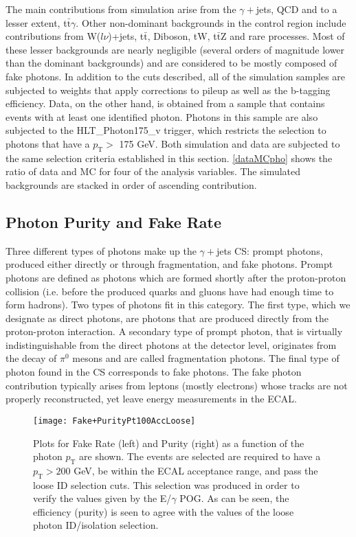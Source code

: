 The main contributions from simulation arise from the $\gamma+$jets, QCD and to a lesser extent, t$\bar{\text{t}}\gamma$. Other non-dominant backgrounds in the control region include contributions from W($l\nu$)+jets, t$\bar{\text{t}}$, Diboson, tW, t$\bar{\text{t}}$Z and rare processes. Most of these lesser backgrounds are nearly negligible (several orders of magnitude lower than the dominant backgrounds) and are considered to be mostly composed of fake photons. In addition to the cuts described, all of the simulation samples are subjected to weights that apply corrections to pileup as well as the b-tagging efficiency. Data, on the other hand, is obtained from a sample that contains events with at least one identified photon. Photons in this sample are also subjected to the HLT\_Photon175\_v trigger, which restricts the selection to photons that have a $p_\text{T} >$ 175 GeV. Both simulation and data are subjected to the same selection criteria established in this section. \autoref{dataMCpho} shows the ratio of data and MC for four of the analysis variables. The simulated backgrounds are stacked in order of ascending contribution.

\subsection{Photon Purity and Fake Rate}\label{purity&fakerate}

Three different types of photons make up the $\gamma+$jets CS: prompt photons, produced either directly or through fragmentation, and fake photons. Prompt photons are defined as photons which are formed shortly after the proton-proton collision (i.e. before the produced quarks and gluons have had enough time to form hadrons). Two types of photons fit in this category. The first type, which we designate as direct photons, are photons that are produced directly from the proton-proton interaction\cite{promptPho}. A secondary type of prompt photon, that is virtually indistinguishable from the direct photons at the detector level, originates from the decay of $\pi^0$ mesons and are called fragmentation photons. The final type of photon found in the CS corresponds to fake photons. The fake photon contribution typically arises from leptons (mostly electrons) whose tracks are not properly reconstructed, yet leave energy measurements in the ECAL.

\begin{figure}[H]
\begin{center}
\texttt{[image: Fake+PurityPt100AccLoose]}
\end{center}
\vspace{-1em}
\caption{Plots for Fake Rate (left) and Purity (right) as a function of the photon $p_\text{T}$ are shown. The events are selected are required to have a $p_\text{T} > 200$ GeV, be within the ECAL acceptance range, and pass the loose ID selection cuts. This selection was produced in order to verify the values given by the E/$\gamma$ POG. As can be seen, the efficiency (purity) is seen to agree with the values of the loose photon ID/isolation selection.}
\label{FakeRatePurityLoose}
\end{figure}

